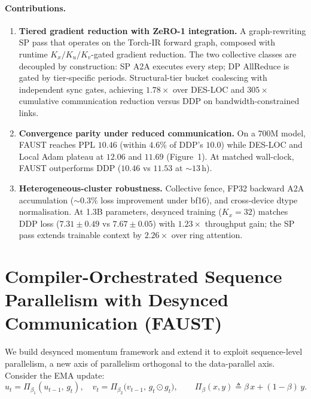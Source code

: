\documentclass{article}
\begin{document}
\paragraph{Contributions.}
\begin{enumerate}

    \item \textbf{Tiered gradient reduction with ZeRO-1 integration.}
    A graph-rewriting SP pass that operates on the Torch-IR forward graph,
    composed with runtime $K_x/K_u/K_v$-gated gradient reduction. The two
    collective classes are decoupled by construction: SP A2A executes every
    step; DP AllReduce is gated by tier-specific periods. Structural-tier bucket coalescing with independent sync gates, achieving
    $1.78{\times}$ over DES-LOC and $305{\times}$ cumulative communication
    reduction versus DDP on bandwidth-constrained links.

    \item \textbf{Convergence parity under reduced communication.}
    On a 700M model, FAUST reaches PPL $10.46$ (within $4.6\%$ of DDP's $10.0$)
    while DES-LOC and Local Adam plateau at $12.06$ and $11.69$ (Figure~1).
    At matched wall-clock, FAUST outperforms DDP ($10.46$ vs $11.53$ at ${\sim}13$\,h).

    \item \textbf{Heterogeneous-cluster robustness.}
    Collective fence, FP32 backward A2A accumulation (${\sim}0.3\%$ loss
    improvement under bf16), and cross-device dtype normalisation. At 1.3B parameters, desynced training ($K_x{=}32$) matches DDP loss
    ($7.31 {\pm} 0.49$ vs $7.67 {\pm} 0.05$) with $1.23{\times}$ throughput
    gain; the SP pass extends trainable context by $2.26{\times}$ over ring attention.
\end{enumerate}



\section{Compiler-Orchestrated Sequence Parallelism with Desynced Communication (FAUST)}
\label{sec:FAUST}

We build desynced momentum framework and extend it to exploit sequence-level
parallelism, a new axis of parallelism orthogonal to the data-parallel axis. Consider the EMA update:
\begin{equation}
u_t = \Pi_{\beta_1}(u_{t-1},\, g_t), \quad v_t = \Pi_{\beta_2}\!\bigl(v_{t-1},\, g_t \odot g_t\bigr), \qquad \Pi_\beta(x,y) \triangleq \beta\, x + (1 - \beta)\, y.
\end{equation}
\end{document}
